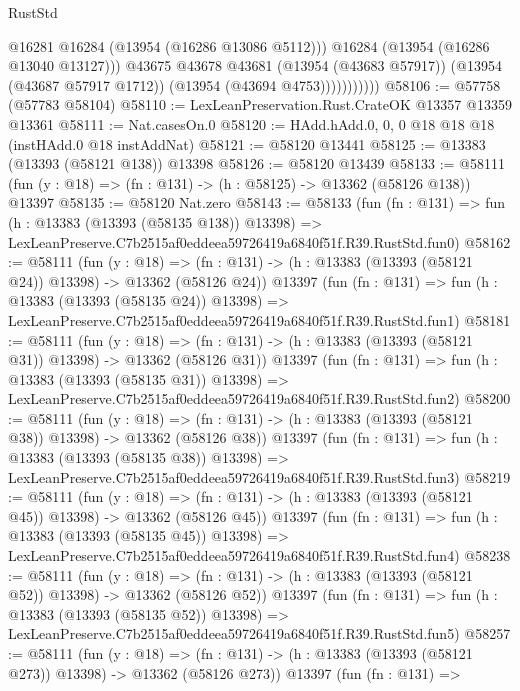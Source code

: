 \begin{lexlean}{RustStd}
\begin{coremodule}
                          @16281
                          @16284
                          (@13954 (@16286 @13086 @5112)))
                        @16284
                        (@13954 (@16286 @13040 @13127)))
                      @43675
                      @43678
                      @43681
                      (@13954 (@43683 @57917))
                      (@13954 (@43687 @57917 @1712))
                      (@13954 (@43694 @4753)))))))))))
@58106 := @57758 (@57783 @58104)
@58110 := LexLeanPreservation.Rust.CrateOK @13357 @13359 @13361
@58111 := Nat.casesOn.{0}
@58120 := HAdd.hAdd.{0, 0, 0} @18 @18 @18 (instHAdd.{0} @18 instAddNat)
@58121 := @58120 @13441
@58125 := @13383 (@13393 (@58121 @138)) @13398
@58126 := @58120 @13439
@58133 := @58111 (fun (y : @18) => (fn : @131) -> (h : @58125) -> @13362 (@58126 @138)) @13397
@58135 := @58120 Nat.zero
@58143 := @58133
    (fun (fn : @131) =>
    fun (h : @13383 (@13393 (@58135 @138)) @13398) =>
    LexLeanPreserve.C7b2515af0eddeea59726419a6840f51f.R39.RustStd.fun0)
@58162 := @58111
    (fun (y : @18) =>
    (fn : @131) -> (h : @13383 (@13393 (@58121 @24)) @13398) -> @13362 (@58126 @24))
    @13397
    (fun (fn : @131) =>
    fun (h : @13383 (@13393 (@58135 @24)) @13398) =>
    LexLeanPreserve.C7b2515af0eddeea59726419a6840f51f.R39.RustStd.fun1)
@58181 := @58111
    (fun (y : @18) =>
    (fn : @131) -> (h : @13383 (@13393 (@58121 @31)) @13398) -> @13362 (@58126 @31))
    @13397
    (fun (fn : @131) =>
    fun (h : @13383 (@13393 (@58135 @31)) @13398) =>
    LexLeanPreserve.C7b2515af0eddeea59726419a6840f51f.R39.RustStd.fun2)
@58200 := @58111
    (fun (y : @18) =>
    (fn : @131) -> (h : @13383 (@13393 (@58121 @38)) @13398) -> @13362 (@58126 @38))
    @13397
    (fun (fn : @131) =>
    fun (h : @13383 (@13393 (@58135 @38)) @13398) =>
    LexLeanPreserve.C7b2515af0eddeea59726419a6840f51f.R39.RustStd.fun3)
@58219 := @58111
    (fun (y : @18) =>
    (fn : @131) -> (h : @13383 (@13393 (@58121 @45)) @13398) -> @13362 (@58126 @45))
    @13397
    (fun (fn : @131) =>
    fun (h : @13383 (@13393 (@58135 @45)) @13398) =>
    LexLeanPreserve.C7b2515af0eddeea59726419a6840f51f.R39.RustStd.fun4)
@58238 := @58111
    (fun (y : @18) =>
    (fn : @131) -> (h : @13383 (@13393 (@58121 @52)) @13398) -> @13362 (@58126 @52))
    @13397
    (fun (fn : @131) =>
    fun (h : @13383 (@13393 (@58135 @52)) @13398) =>
    LexLeanPreserve.C7b2515af0eddeea59726419a6840f51f.R39.RustStd.fun5)
@58257 := @58111
    (fun (y : @18) =>
    (fn : @131) -> (h : @13383 (@13393 (@58121 @273)) @13398) -> @13362 (@58126 @273))
    @13397
    (fun (fn : @131) =>

\end{coremodule}
\end{lexlean}
